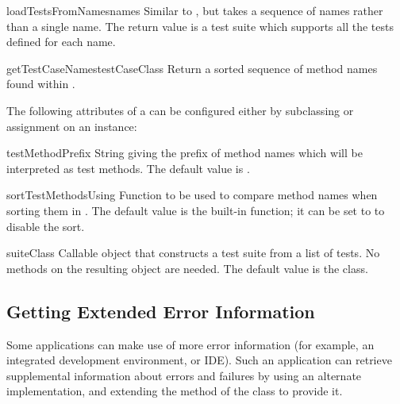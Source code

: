 \begin{methoddesc}[TestLoader]{loadTestsFromNames}{names}
  Similar to , but takes a sequence of
  names rather than a single name.  The return value is a test suite
  which supports all the tests defined for each name.
\end{methoddesc}

\begin{methoddesc}[TestLoader]{getTestCaseNames}{testCaseClass}
  Return a sorted sequence of method names found within
  .
\end{methoddesc}


The following attributes of a  can be configured
either by subclassing or assignment on an instance:

\begin{memberdesc}[TestLoader]{testMethodPrefix}
  String giving the prefix of method names which will be interpreted
  as test methods.  The default value is .
\end{memberdesc}

\begin{memberdesc}[TestLoader]{sortTestMethodsUsing}
  Function to be used to compare method names when sorting them in
  .  The default value is the built-in
   function; it can be set to  to disable
  the sort.
\end{memberdesc}

\begin{memberdesc}[TestLoader]{suiteClass}
  Callable object that constructs a test suite from a list of tests.
  No methods on the resulting object are needed.  The default value is
  the  class.
\end{memberdesc}


\subsection{Getting Extended Error Information
            \label{unittest-error-info}}

Some applications can make use of more error information (for example,
an integrated development environment, or IDE).  Such an application
can retrieve supplemental information about errors and failures by
using an alternate  implementation, and extending
the  method of the  class
to provide it.

